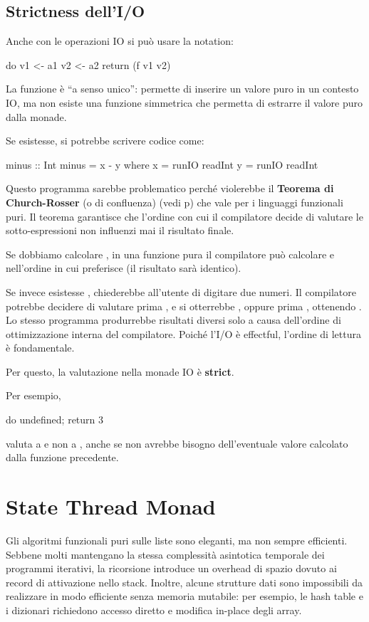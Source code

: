 \subsection{Strictness dell'I/O}

Anche con le operazioni IO si può usare la  notation:
\begin{haskellbox}{}
do
  v1 <- a1
  v2 <- a2
  return (f v1 v2)
\end{haskellbox}

La funzione  è ``a senso unico'': permette di inserire un valore puro in un contesto IO, ma non esiste una funzione simmetrica  che permetta di estrarre il valore puro dalla monade.

Se esistesse, si potrebbe scrivere codice come:
\begin{haskellbox}{}
minus :: Int
minus = x - y 
  where
    x = runIO readInt
    y = runIO readInt
\end{haskellbox}

Questo programma sarebbe problematico perché violerebbe il \textbf{Teorema di Church-Rosser} (o di confluenza) (vedi p\pageref{thm:church_rosser}) che vale per i linguaggi funzionali puri. Il teorema garantisce che l'ordine con cui il compilatore decide di valutare le sotto-espressioni non influenzi mai il risultato finale.

Se dobbiamo calcolare , in una funzione pura il compilatore può calcolare  e  nell'ordine in cui preferisce (il risultato sarà identico).

Se invece esistesse ,  chiederebbe all'utente di digitare due numeri. Il compilatore potrebbe decidere di valutare prima , e si otterrebbe , oppure prima , ottenendo . Lo stesso programma produrrebbe risultati diversi solo a causa dell'ordine di ottimizzazione interna del compilatore. Poiché l'I/O è effectful, l'ordine di lettura è fondamentale.

Per questo, la valutazione nella monade IO è \textbf{strict}.

Per esempio,
\begin{haskellbox}{}
do { undefined; return 3 }
\end{haskellbox}
valuta a  e non a , anche se  non avrebbe bisogno dell'eventuale valore calcolato dalla funzione precedente.

\section{State Thread Monad}
Gli algoritmi funzionali puri sulle liste sono eleganti, ma non sempre efficienti. Sebbene molti mantengano la stessa complessità asintotica temporale dei programmi iterativi, la ricorsione introduce un overhead di spazio dovuto ai record di attivazione nello stack. Inoltre, alcune strutture dati sono impossibili da realizzare in modo efficiente senza memoria mutabile: per esempio, le hash table e i dizionari richiedono accesso diretto e modifica in-place degli array.

